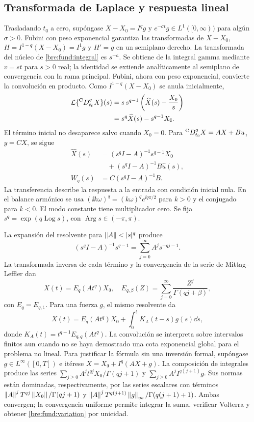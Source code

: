 \subsection{Transformada de Laplace y respuesta lineal}

Trasladando $t_0$ a cero, supóngase $X-X_0=I^qg$ y
$e^{-\sigma t}g\in L^1([0,\infty))$ para algún $\sigma>0$.
Fubini con peso exponencial garantiza las transformadas de $X-X_0$,
$H=I^{1-q}(X-X_0)=I^1g$ y $H'=g$ en un semiplano derecho.
La transformada del núcleo de \eqref{bre:fund:integral}
es $s^{-a}$. Se obtiene de la integral gamma mediante $v=st$ para
$s>0$ real; la identidad se extiende analíticamente al semiplano de
convergencia con la rama principal. Fubini, ahora con peso exponencial,
convierte la convolución en producto. Como
$I^{1-q}(X-X_0)$ se anula inicialmente,
\begin{align}
 \mathcal L\{{}^{\mathrm C}D_{t_0}^{q}X\}(s)
 &=s\,s^{q-1}\left(\widehat X(s)-\frac{X_0}{s}\right)\nonumber\\
 &=s^q\widehat X(s)-s^{q-1}X_0.
 \label{bre:fund:laplace}
\end{align}
El término inicial no desaparece salvo cuando $X_0=0$.
Para ${}^{\mathrm C}D_{t_0}^{q}X=AX+Bu$, $y=CX$, se sigue
\begin{align}
 \widehat X(s)&=(s^qI-A)^{-1}s^{q-1}X_0\nonumber\\
 &\quad+(s^qI-A)^{-1}B\widehat u(s),\nonumber\\
 W_q(s)&=C(s^qI-A)^{-1}B.
 \label{bre:fund:transfer}
\end{align}
La transferencia describe la respuesta a la entrada con condición inicial
nula. En el balance armónico se usa
$(\ii k\omega)^q=(k\omega)^q e^{\ii q\pi/2}$ para $k>0$ y el conjugado
para $k<0$. El modo constante tiene multiplicador cero. Se fija
$s^q=\exp(q\operatorname{Log}s)$, con
$\operatorname{Arg}s\in(-\pi,\pi)$.

La expansión del resolvente para $\norm A<|s|^q$ produce
\[
 (s^qI-A)^{-1}s^{q-1}
 =\sum_{j=0}^\infty A^j s^{-qj-1}.
\]
La transformada inversa de cada término y la convergencia de la serie
de Mittag--Leffler dan
\begin{equation}
 X(t)=E_q(At^q)X_0,\quad
 E_{q,\beta}(Z)=\sum_{j=0}^\infty\frac{Z^j}{\Gamma(qj+\beta)},
 \label{bre:fund:ML}
\end{equation}
con $E_q=E_{q,1}$. Para una fuerza $g$, el mismo resolvente da
\begin{equation}
 X(t)=E_q(At^q)X_0+
 \int_0^t K_A(t-s)g(s)\dd s,
 \label{bre:fund:variation}
\end{equation}
donde $K_A(t)=t^{q-1}E_{q,q}(At^q)$. La convolución se interpreta sobre
intervalos finitos aun cuando no se haya demostrado una cota exponencial
global para el problema no lineal.
Para justificar la fórmula sin una inversión formal, supóngase
$g\in L^\infty([0,T])$ e itérese
$X=X_0+I^q(AX+g)$. La composición de integrales produce las series
$\sum_{j\ge0}A^jt^{qj}X_0/\Gamma(qj+1)$ y
$\sum_{j\ge0}A^jI^{q(j+1)}g$. Sus normas están dominadas,
respectivamente, por las series escalares con términos
$\left\lVert A\right\rVert^jT^{qj}\left\lVert X_0\right\rVert/\Gamma(qj+1)$ y
$\left\lVert A\right\rVert^jT^{q(j+1)}\left\lVert g\right\rVert_\infty/\Gamma(q(j+1)+1)$.
Ambas convergen; la convergencia uniforme permite integrar la suma,
verificar Volterra y obtener \eqref{bre:fund:variation} por unicidad.


